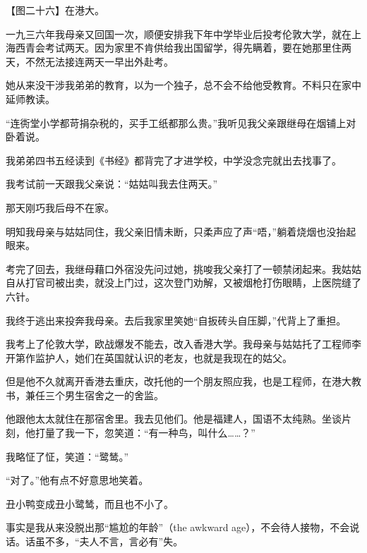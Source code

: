 \clearpage
\par 【图二十六】在港大。
\par 一九三六年我母亲又回国一次，顺便安排我下年中学毕业后投考伦敦大学，就在上海西青会考试两天。因为家里不肯供给我出国留学，得先瞒着，要在她那里住两天，不然无法接连两天一早出外赴考。
\par 她从来没干涉我弟弟的教育，以为一个独子，总不会不给他受教育。不料只在家中延师教读。
\par “连衖堂小学都苛捐杂税的，买手工纸都那么贵。”我听见我父亲跟继母在烟铺上对卧着说。
\par 我弟弟四书五经读到《书经》都背完了才进学校，中学没念完就出去找事了。
\par 我考试前一天跟我父亲说：“姑姑叫我去住两天。”
\par 那天刚巧我后母不在家。
\par 明知我母亲与姑姑同住，我父亲旧情未断，只柔声应了声“唔，”躺着烧烟也没抬起眼来。
\par 考完了回去，我继母藉口外宿没先问过她，挑唆我父亲打了一顿禁闭起来。我姑姑自从打官司被出卖，就没上门过，这次登门劝解，又被烟枪打伤眼睛，上医院缝了六针。
\par 我终于逃出来投奔我母亲。去后我家里笑她“自扳砖头自压脚，”代背上了重担。
\par 我考上了伦敦大学，欧战爆发不能去，改入香港大学。我母亲与姑姑托了工程师李开第作监护人，她们在英国就认识的老友，也就是我现在的姑父。
\par 但是他不久就离开香港去重庆，改托他的一个朋友照应我，也是工程师，在港大教书，兼任三个男生宿舍之一的舍监。
\par 他跟他太太就住在那宿舍里。我去见他们。他是福建人，国语不太纯熟。坐谈片刻，他打量了我一下，忽笑道：“有一种鸟，叫什么……？”
\par 我略怔了怔，笑道：“鹭鸶。”
\par “对了。”他有点不好意思地笑着。
\par 丑小鸭变成丑小鹭鸶，而且也不小了。
\par 事实是我从来没脱出那“尴尬的年龄”（the awkward age），不会待人接物，不会说话。话虽不多，“夫人不言，言必有”失。
